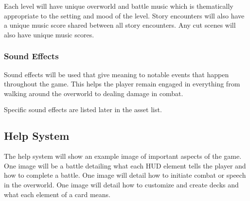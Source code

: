 \documentclass[12pt,titlepage]{article}
\begin{document}
Each level will have unique overworld and battle music which is thematically 
appropriate to the setting and mood of the level. Story encounters will also 
have a unique music score shared between all story encounters. Any cut scenes 
will also have unique music scores.

\subsubsection{Sound Effects}

Sound effects will be used that give meaning to notable events that happen 
throughout the game. This helps the player remain engaged in everything from 
walking around the overworld to dealing damage in combat.

Specific sound effects are listed later in the asset list.

\subsection{Help System}

The help system will show an example image of important aspects of the game. 
One image will be a battle detailing what each HUD element tells the player and 
how to complete a battle. One image will detail how to initiate combat or 
speech in the overworld. One image will detail how to customize and create 
decks and what each element of a card means.

\newpage



\end{document}
